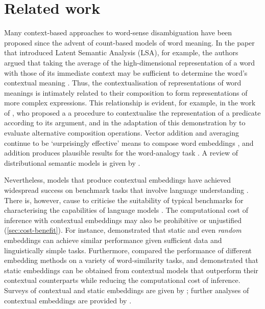 \section{Related work}
\label{sec:related-work}

Many context-based approaches to word-sense disambiguation have been proposed since the
advent of count-based models of word meaning.
In the paper that introduced Latent Semantic Analysis (LSA), for example, the authors
argued that taking the average of the high-dimensional representation of a word with
those of its immediate context may be sufficient to determine the word's contextual
meaning \parencite[229-230]{Landauer1997}.
Thus, the contextualisation of representations of word meanings is intimately related
to their composition to form representations of more complex expressions.
This relationship is evident, for example, in the work of \textcite{Kintsch2001}, who
proposed a a procedure to contextualise the representation of a predicate according to
its argument, and in the adaptation of this demonstration by \textcite{Mitchell2008} to
evaluate alternative composition operations.
Vector addition and averaging continue to be `surprisingly effective' means to compose
word embeddings \parencite[10]{Boleda2020}, and addition produces plausible results for
the word-analogy task \parencites[e.g.,][9]{Mikolov2013}[7]{Mikolov2013a}.
A review of distributional semantic models is given by \textcite{Lenci2018}.

Nevertheless, models that produce contextual embeddings have achieved widespread
success on benchmark tasks that involve language understanding
\parencite[22-27]{Bommasani2022}.
There is, however, cause to criticise the suitability of typical benchmarks for
characterising the capabilities of language models \parencite[5-6]{Srivastava2023}.
The computational cost of inference with contextual embeddings may also be prohibitive
or unjustified (\cref{sec:cost-benefit}).
For instance, \textcite{Arora2020} demonstrated that static and even \emph{random}
embeddings can achieve similar performance given sufficient data and linguistically
simple tasks.
Furthermore, \textcites[5244-5246]{Gupta2019}[4760-4762]{Bommasani2020} compared the
performance of different embedding methods on a variety of word-similarity tasks, and
demonstrated that static embeddings can be obtained from contextual models that
outperform their contextual counterparts while reducing the computational cost of
inference.
Surveys of contextual and static embeddings are given by
\textcites{Liu2020}{Torregrossa2021}; further analyses of contextual embeddings are
provided by \textcites{Hewitt2019}{Liu2019}{Reif2019}{Brunner2019}.

